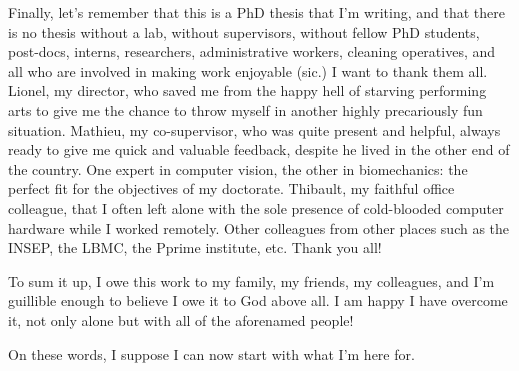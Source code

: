 Finally, let's remember that this is a PhD thesis that I'm writing, and that there is no thesis without a lab, without supervisors, without fellow PhD students, post-docs, interns, researchers, administrative workers, cleaning operatives, and all who are involved in making work enjoyable (sic.) I want to thank them all. Lionel, my director, who saved me from the happy hell of starving performing arts to give me the chance to throw myself in another highly precariously fun situation. Mathieu, my co-supervisor, who was quite present and helpful, always ready to give me quick and valuable feedback, despite he lived in the other end of the country. One expert in computer vision, the other in biomechanics: the perfect fit for the objectives of my doctorate. Thibault, my faithful office colleague, that I often left alone with the sole presence of cold-blooded computer hardware while I worked remotely. Other colleagues from other places such as the INSEP, the LBMC, the Pprime institute, etc. Thank you all!

To sum it up, I owe this work to my family, my friends, my colleagues, and I'm guillible enough to believe I owe it to God above all. I am happy I have overcome it, not only alone but with all of the aforenamed people!

On these words, I suppose I can now start with what I'm here for.